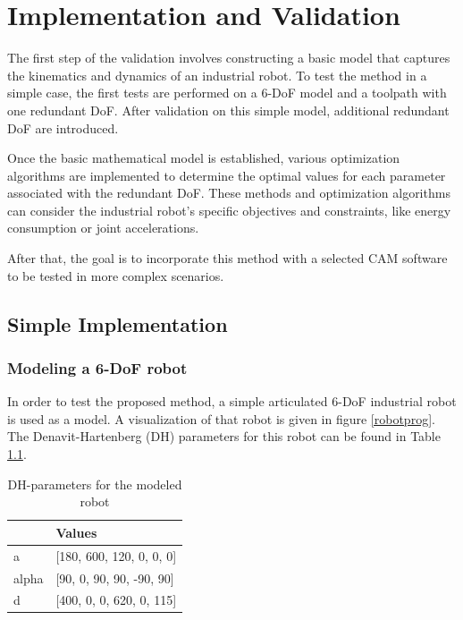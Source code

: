 \chapter{Implementation and Validation}%

The first step of the validation involves constructing a basic model that captures the kinematics and dynamics of an industrial robot. To test the method in a simple case, the first tests are performed on a 6-DoF model and a toolpath with one redundant DoF. After validation on this simple model, additional redundant DoF are introduced. 

Once the basic mathematical model is established, various optimization algorithms are implemented to determine the optimal values for each parameter associated with the redundant DoF. These methods and optimization algorithms can consider the industrial robot's specific objectives and constraints, like energy consumption or joint accelerations. 

After that, the goal is to incorporate this method with a selected CAM software to be tested in more complex scenarios.

\section{Simple Implementation}%
\subsection{Modeling a 6-DoF robot}
In order to test the proposed method, a simple articulated 6-DoF industrial robot is used as a model. A visualization of that robot is given in figure \ref{robotprog}. The Denavit-Hartenberg (DH) parameters for this robot can be found in Table \ref{DH}.


\begin{table}[H]
	\centering
	\begin{tabular}{||l|l||}
		  & Values \\
		\hline
		\hline
		\hline
		a	& [180, 600, 120, 0, 0, 0] \\
		alpha	&  [90, 0, 90, 90, -90, 90] \\
		d	& [400, 0, 0, 620, 0, 115]\\
		
		\hline
		\hline
	\end{tabular}
	
	\caption{DH-parameters for the modeled robot}
	\label{DH}
\end{table}

